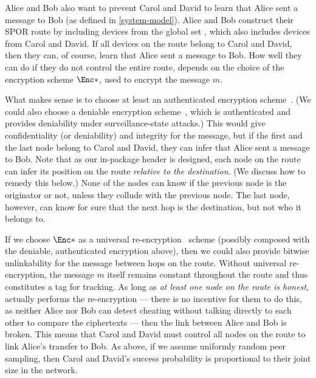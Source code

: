 Alice and Bob also want to prevent Carol and David to learn that Alice sent a 
message to Bob (as defined in \cref{system-model}).
Alice and Bob construct their \ac{SPOR} route by including devices from the 
global set %
, which also includes devices from Carol and David.
If all devices on the route belong to Carol and David, then they can, of course, 
learn that Alice sent a message to Bob.
How well they can do if they do not control the entire route, depends on the 
choice of the encryption scheme \(\Enc*\), used to encrypt the message \(m\). 

What makes sense is to choose at least an authenticated encryption 
scheme~\cite{AuthEncryption}.
(We could also choose a deniable encryption scheme~\cite{DeniableEncryption}, 
\eg \cite{OTPKX} which is authenticated and provides deniability under
surveillance-state attacks.) %
This would give confidentiality (or deniability) and integrity for the message, 
but if the first and the last node belong to Carol and David, they can infer 
that Alice sent a message to Bob.
Note that as our in-package header is designed, each node on the route can infer 
its position on the route \emph{relative to the destination}.
(We discuss how to remedy this below.)
None of the nodes can know if the previous node is the originator or not, unless 
they collude with the previous node.
The last node, however, can know for sure that the next hop is the destination, 
but not who it belongs to.

If we choose \(\Enc*\) as a universal re-encryption~\cite{UniversalReencryption} 
scheme (possibly composed with the deniable, authenticated encryption above), 
then we could also provide bitwise unlinkability for the message between hops on 
the route.
Without universal re-encryption, the message \(m\) itself remains constant 
throughout the route and thus constitutes a tag for tracking.
As long as \emph{at least one node on the route is honest}, \ie actually 
performs the re-encryption --- there is no incentive for them to do this, as 
neither Alice nor Bob can detect cheating without talking directly to each other 
to compare the ciphertexts --- then the link between Alice and Bob is broken.
This means that Carol and David must control all nodes on the route to link 
Alice's transfer to Bob.
As above, if we assume uniformly random peer sampling, then Carol and David's 
success probability is proportional to their joint size in the network.

